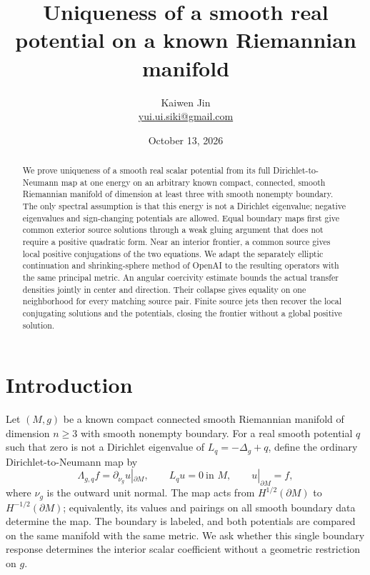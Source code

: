 \documentclass[11pt]{article}
\title{Uniqueness of a smooth real potential on a known Riemannian manifold}
\author{Kaiwen Jin\\\small\href{mailto:yui.ui.siki@gmail.com}{yui.ui.siki@gmail.com}}
\date{October 13, 2026}
\theoremstyle{definition}\newtheorem{definition}[theorem]{Definition}
\theoremstyle{remark}\newtheorem{remark}[theorem]{Remark}
\begin{document}
\maketitle
\begin{abstract}
We prove uniqueness of a smooth real scalar potential from its full
Dirichlet-to-Neumann map at one energy on an arbitrary known compact,
connected, smooth Riemannian manifold of dimension at least three with
smooth nonempty boundary. The only spectral assumption is that this energy
is not a Dirichlet eigenvalue; negative eigenvalues and sign-changing
potentials are allowed. Equal boundary maps first give common exterior
source solutions through a weak gluing argument that does not require a
positive quadratic form. Near an interior frontier, a common source gives
local positive conjugations of the two equations. We adapt the separately
elliptic continuation and shrinking-sphere method of OpenAI to the resulting
operators with the same principal metric. An angular coercivity estimate
bounds the actual transfer densities jointly in center and direction. Their
collapse gives equality on one neighborhood for every matching source pair.
Finite source jets then recover the local conjugating solutions and the
potentials, closing the frontier without a global positive solution.
\end{abstract}

\section{Introduction}\label{sec:intro}

Let $(M,g)$ be a known compact connected smooth Riemannian manifold of
dimension $n\ge3$ with smooth nonempty boundary. For a real smooth
potential $q$ such that zero is not a Dirichlet eigenvalue of
$L_q=-\Delta_g+q$, define the ordinary Dirichlet-to-Neumann map by
\begin{equation}\label{eq:DN}
 \Lambda_{g,q}f=\partial_{\nu_g}u|_{\partial M},\qquad
 L_qu=0\ \text{in }M,\qquad u|_{\partial M}=f,
\end{equation}
where $\nu_g$ is the outward unit normal. The map acts from
$H^{1/2}(\partial M)$ to $H^{-1/2}(\partial M)$; equivalently, its
values and pairings on all smooth boundary data determine the map.
The boundary is labeled, and both potentials are compared on the same
manifold with the same metric. We ask whether this single boundary
response determines the interior scalar coefficient without a geometric
restriction on $g$.
\end{document}
